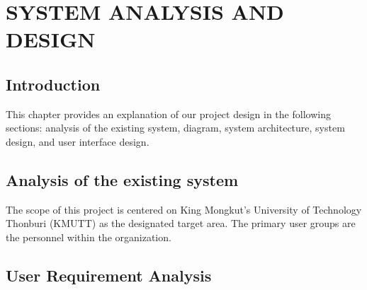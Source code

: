 \chapter{SYSTEM ANALYSIS AND DESIGN}

\section{Introduction}
\par
This chapter provides an explanation of our project design in the following sections: analysis of the existing system, diagram, system architecture, system design, and user interface design.

\section{Analysis of the existing system}
\par
The scope of this project is centered on King Mongkut’s University of Technology Thonburi (KMUTT) as the designated target area. The primary user groups are the personnel within the organization.

\section{User Requirement Analysis}
